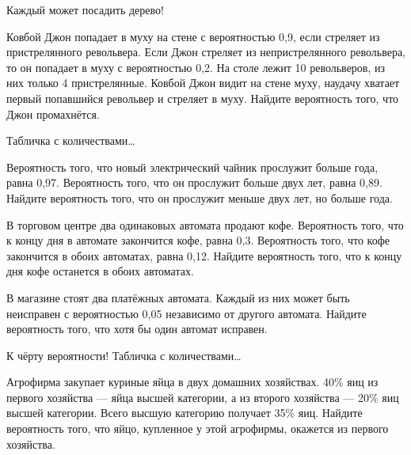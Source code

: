 \documentclass[pdftex,unicode]{beamer}
\begin{document}
\begin{frame}{Каждый может посадить дерево!}


\begin{block}{}
 Ковбой Джон попадает в муху на стене с вероятностью 0,9, если стреляет из пристрелянного револьвера. Если Джон стреляет из непристрелянного револьвера, то он попадает в муху с вероятностью 0,2. На столе лежит 10 револьверов, из них только 4 пристрелянные. Ковбой Джон видит на стене муху, наудачу хватает первый попавшийся револьвер и стреляет в муху. Найдите вероятность того, что Джон промахнётся.
\end{block}




\end{frame}


\begin{frame}{Табличка с количествами\ldots}

\begin{block}{}
 Вероятность того, что новый электрический чайник прослужит больше года, равна 0,97. Вероятность того, что он прослужит больше двух лет, равна 0,89. Найдите вероятность того, что он прослужит меньше двух лет, но больше года.
\end{block}



\begin{block}{}
В торговом центре два одинаковых автомата продают кофе. Вероятность того, что к концу дня в автомате закончится кофе, равна 0,3. Вероятность того, что кофе закончится в обоих автоматах, равна 0,12. Найдите вероятность того, что к концу дня кофе останется в обоих автоматах.
\end{block}

\begin{block}{}
В магазине стоят два платёжных автомата. Каждый из них может быть неисправен с вероятностью 0,05 независимо от другого автомата. Найдите вероятность того, что хотя бы один автомат исправен.
\end{block}

\end{frame}

\begin{frame}{К чёрту вероятности! Табличка с количествами\ldots}

\begin{block}{}
Агрофирма закупает куриные яйца в двух домашних хозяйствах. 40\% яиц из первого хозяйства — яйца высшей категории, а из второго хозяйства — 20\% яиц высшей категории. Всего высшую категорию получает 35\% яиц. Найдите вероятность того, что яйцо, купленное у этой агрофирмы, окажется из первого хозяйства.
\end{block}

\end{frame}
\end{document}

